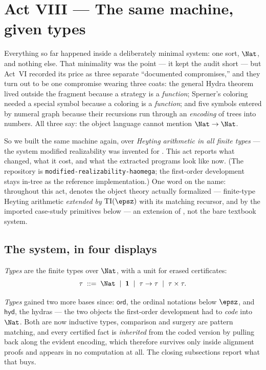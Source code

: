 \section{Act VIII --- The same machine, given types}
\label{sec:haomega}

Everything so far happened inside a deliberately minimal system: one sort,
$\Nat$, and nothing else. That minimality was the point --- it kept the audit
short --- but Act~VI recorded its price as three separate ``documented
compromises,'' and they turn out to be one compromise wearing three coats:
the general Hydra theorem lived outside the fragment because a strategy is a
\emph{function}; Sperner's coloring needed a special symbol because a
coloring is a \emph{function}; and five symbols entered by numeral graph
because their recursions run through an \emph{encoding} of trees into
numbers. All three say: the object language cannot mention $\Nat\to\Nat$.

So we built the same machine again, over \emph{Heyting arithmetic in all
finite types} --- the system modified realizability was invented for
\citep{kreisel1959,troelstra1973}. This act reports what changed, what it
cost, and what the extracted programs look like now. (The repository is
\texttt{modified-realizability-haomega}; the first-order development stays
in-tree as the reference implementation.) One word on the name: throughout
this act, \haomega{} denotes the object theory actually formalized ---
finite-type Heyting arithmetic \emph{extended by} $\mathrm{TI}(\epsz)$ with
its matching recursor, and by the imported case-study primitives below ---
an extension of \haomega{}, not the bare textbook system.

\subsection*{The system, in four displays}

\emph{Types} are the finite types over $\Nat$, with a unit for erased
certificates:
\[
  \tau \;::=\; \Nat \;\mid\; \mathbf{1} \;\mid\; \tau\to\tau
  \;\mid\; \tau\times\tau .
\]

\emph{Types} gained two more bases since: $\mathsf{ord}$, the ordinal
notations below $\epsz$, and $\mathsf{hyd}$, the hydras --- the two objects
the first-order development had to \emph{code} into $\Nat$. Both are now
inductive types, comparison and surgery are pattern matching, and every
certified fact is \emph{inherited} from the coded version by pulling back
along the evident encoding, which therefore survives only inside alignment
proofs and appears in no computation at all. The closing subsections report
what that buys.

